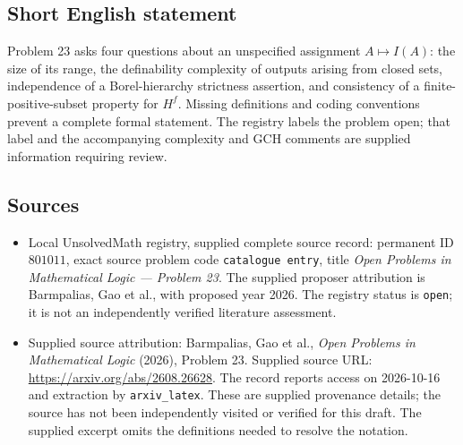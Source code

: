 \documentclass[11pt]{article}
\begin{document}
\subsection{Short English statement}
Problem 23 asks four questions about an unspecified assignment \(A\mapsto I(A)\): the size of its range, the definability complexity of outputs arising from closed sets, independence of a Borel-hierarchy strictness assertion, and consistency of a finite-positive-subset property for \(H^f\). Missing definitions and coding conventions prevent a complete formal statement. The registry labels the problem open; that label and the accompanying complexity and GCH comments are supplied information requiring review.
\subsection{Sources}
\begin{itemize}
\item Local UnsolvedMath registry, supplied complete source record: permanent ID \(801011\), exact source problem code \texttt{catalogue entry}, title \emph{Open Problems in Mathematical Logic --- Problem 23}. The supplied proposer attribution is Barmpalias, Gao et al., with proposed year 2026. The registry status is \texttt{open}; it is not an independently verified literature assessment.
\item Supplied source attribution: Barmpalias, Gao et al., \emph{Open Problems in Mathematical Logic} (2026), Problem 23. Supplied source URL: \url{https://arxiv.org/abs/2608.26628}. The record reports access on 2026-10-16 and extraction by \texttt{arxiv\_latex}. These are supplied provenance details; the source has not been independently visited or verified for this draft. The supplied excerpt omits the definitions needed to resolve the notation.
\end{itemize}
\end{document}
